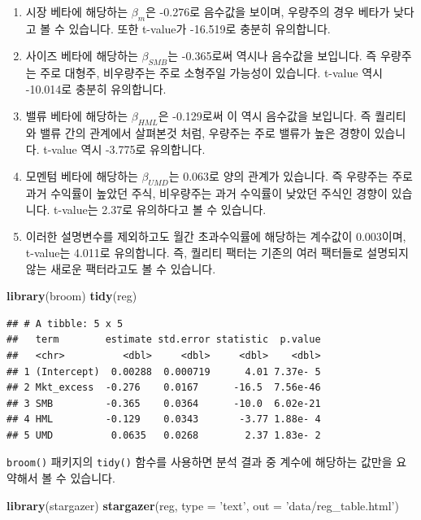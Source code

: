 \documentclass[12pt,]{book}
\newenvironment{Shaded}{\begin{snugshade}}{\end{snugshade}}
\newcommand{\DataTypeTok}[1]{\textcolor[rgb]{0.13,0.29,0.53}{#1}}
\newcommand{\KeywordTok}[1]{\textcolor[rgb]{0.13,0.29,0.53}{\textbf{#1}}}
\newcommand{\NormalTok}[1]{#1}
\newcommand{\StringTok}[1]{\textcolor[rgb]{0.31,0.60,0.02}{#1}}
\providecommand{\tightlist}{%
  \setlength{\itemsep}{0pt}\setlength{\parskip}{0pt}}
\begin{document}
\begin{enumerate}
\def\labelenumi{\arabic{enumi}.}
\tightlist
\item
  시장 베타에 해당하는 \(\beta_m\)은 -0.276로 음수값을 보이며, 우량주의 경우 베타가 낮다고 볼 수 있습니다. 또한 t-value가 -16.519로 충분히 유의합니다.
\item
  사이즈 베타에 해당하는 \(\beta_{SMB}\)는 -0.365로써 역시나 음수값을 보입니다. 즉 우량주는 주로 대형주, 비우량주는 주로 소형주일 가능성이 있습니다. t-value 역시 -10.014로 충분히 유의합니다.
\item
  밸류 베타에 해당하는 \(\beta_{HML}\)은 -0.129로써 이 역시 음수값을 보입니다. 즉 퀄리티와 밸류 간의 관계에서 살펴본것 처럼, 우량주는 주로 밸류가 높은 경향이 있습니다. t-value 역시 -3.775로 유의합니다.
\item
  모멘텀 베타에 해당하는 \(\beta_{UMD}\)는 0.063로 양의 관계가 있습니다. 즉 우량주는 주로 과거 수익률이 높았던 주식, 비우량주는 과거 수익률이 낮았던 주식인 경향이 있습니다. t-value는 2.37로 유의하다고 볼 수 있습니다.
\item
  이러한 설명변수를 제외하고도 월간 초과수익률에 해당하는 계수값이 0.003이며, t-value는 4.011로 유의합니다. 즉, 퀄리티 팩터는 기존의 여러 팩터들로 설명되지 않는 새로운 팩터라고도 볼 수 있습니다.
\end{enumerate}

\begin{Shaded}
\begin{Highlighting}[]
\KeywordTok{library}\NormalTok{(broom)}
\KeywordTok{tidy}\NormalTok{(reg)}
\end{Highlighting}
\end{Shaded}

\begin{verbatim}
## # A tibble: 5 x 5
##   term        estimate std.error statistic  p.value
##   <chr>          <dbl>     <dbl>     <dbl>    <dbl>
## 1 (Intercept)  0.00288  0.000719      4.01 7.37e- 5
## 2 Mkt_excess  -0.276    0.0167      -16.5  7.56e-46
## 3 SMB         -0.365    0.0364      -10.0  6.02e-21
## 4 HML         -0.129    0.0343       -3.77 1.88e- 4
## 5 UMD          0.0635   0.0268        2.37 1.83e- 2
\end{verbatim}

\texttt{broom()} 패키지의 \texttt{tidy()} 함수를 사용하면 분석 결과 중 계수에 해당하는 값만을 요약해서 볼 수 있습니다.

\begin{Shaded}
\begin{Highlighting}[]
\KeywordTok{library}\NormalTok{(stargazer)}
\KeywordTok{stargazer}\NormalTok{(reg, }\DataTypeTok{type =} \StringTok{'text'}\NormalTok{, }\DataTypeTok{out =} \StringTok{'data/reg_table.html'}\NormalTok{)}
\end{Highlighting}
\end{Shaded}
\end{document}
